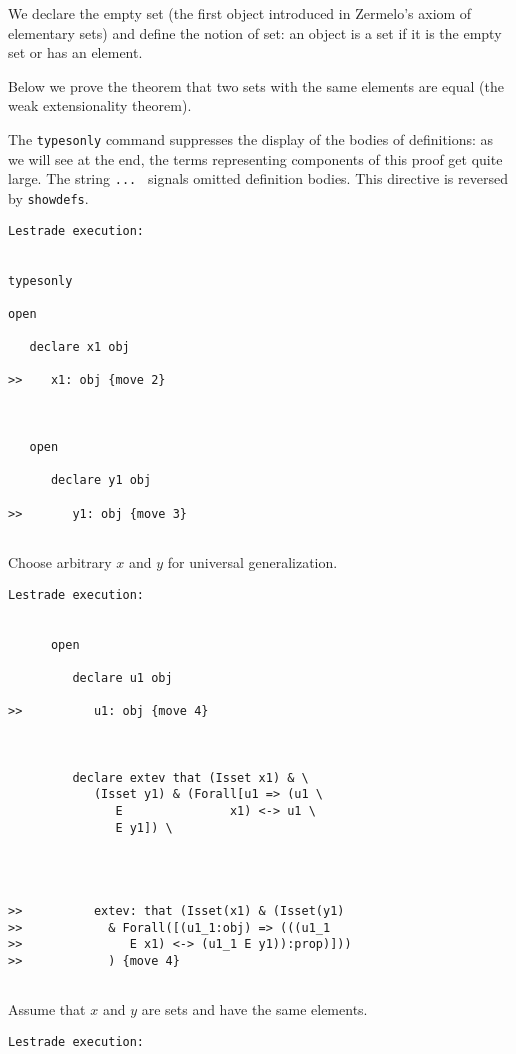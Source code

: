 \documentclass{article}
\begin{document}
We declare the empty set (the first object introduced in Zermelo's axiom of elementary sets) and define the notion of set:  an object is a set if it is the empty
set or has an element.

Below we prove the theorem that two sets with the same elements are equal (the weak extensionality theorem). 

The {\tt typesonly} command suppresses the display of the bodies of definitions:  as we will see at the end, the terms representing components of this proof get quite large.
The string {\tt ... } signals omitted definition bodies.  This directive is reversed by {\tt showdefs}.

{\small

\begin{verbatim}Lestrade execution:


typesonly

open

   declare x1 obj

>>    x1: obj {move 2}



   open

      declare y1 obj

>>       y1: obj {move 3}


\end{verbatim}

Choose arbitrary $x$ and $y$ for universal generalization.

\begin{verbatim}Lestrade execution:


      open

         declare u1 obj

>>          u1: obj {move 4}



         declare extev that (Isset x1) & \
            (Isset y1) & (Forall[u1 => (u1 \
               E               x1) <-> u1 \
               E y1]) \
            



>>          extev: that (Isset(x1) & (Isset(y1)
>>            & Forall([(u1_1:obj) => (((u1_1
>>               E x1) <-> (u1_1 E y1)):prop)]))
>>            ) {move 4}


\end{verbatim}


Assume that $x$ and $y$ are sets and have the same elements.

\begin{verbatim}Lestrade execution:



\end{verbatim}}
\end{document}
